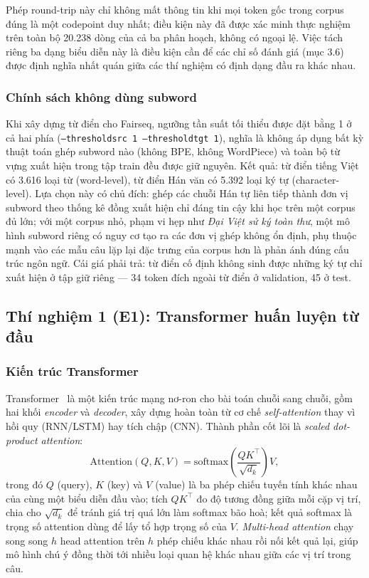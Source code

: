 Phép round-trip này chỉ không mất thông tin khi mọi token gốc trong corpus đúng là một
codepoint duy nhất; điều kiện này đã được xác minh thực nghiệm trên toàn bộ 20.238 dòng
của cả ba phân hoạch, không có ngoại lệ. Việc tách riêng ba dạng biểu diễn này là điều
kiện cần để các chỉ số đánh giá (mục 3.6) được định nghĩa nhất quán giữa các thí nghiệm
có định dạng đầu ra khác nhau.

\subsubsection{Chính sách không dùng subword}

Khi xây dựng từ điển cho Fairseq, ngưỡng tần suất tối thiểu được đặt bằng 1 ở cả hai phía
(\texttt{--thresholdsrc 1 --thresholdtgt 1}), nghĩa là không áp dụng bất kỳ thuật toán
ghép subword nào (không BPE, không WordPiece) và toàn bộ từ vựng xuất hiện trong tập
train đều được giữ nguyên. Kết quả: từ điển tiếng Việt có 3.616 loại từ (word-level), từ
điển Hán văn có 5.392 loại ký tự (character-level). Lựa chọn này có chủ đích: ghép các
chuỗi Hán tự liên tiếp thành đơn vị subword theo thống kê đồng xuất hiện chỉ đáng tin cậy
khi học trên một corpus đủ lớn; với một corpus nhỏ, phạm vi hẹp như \textit{Đại Việt sử
ký toàn thư}, một mô hình subword riêng có nguy cơ tạo ra các đơn vị ghép không ổn định,
phụ thuộc mạnh vào các mẫu câu lặp lại đặc trưng của corpus hơn là phản ánh đúng cấu trúc
ngôn ngữ. Cái giá phải trả: từ điển cố định không sinh được những ký tự chỉ xuất hiện ở
tập giữ riêng — 34 token đích ngoài từ điển ở validation, 45 ở test.

\subsection{Thí nghiệm 1 (E1): Transformer huấn luyện từ đầu}

\subsubsection{Kiến trúc Transformer}

Transformer~\cite{vaswani2017attention} là một kiến trúc mạng nơ-ron cho bài toán chuỗi
sang chuỗi, gồm hai khối \textit{encoder} và \textit{decoder}, xây dựng hoàn toàn từ cơ
chế \textit{self-attention} thay vì hồi quy (RNN/LSTM) hay tích chập (CNN). Thành phần
cốt lõi là \textit{scaled dot-product attention}:
\begin{equation}
  \mathrm{Attention}(Q,K,V) = \mathrm{softmax}\!\left(\frac{QK^{\top}}{\sqrt{d_k}}\right)V,
  \label{eq:e1-attention}
\end{equation}
trong đó $Q$ (query), $K$ (key) và $V$ (value) là ba phép chiếu tuyến tính khác nhau của
cùng một biểu diễn đầu vào; tích $QK^{\top}$ đo độ tương đồng giữa mỗi cặp vị trí, chia
cho $\sqrt{d_k}$ để tránh giá trị quá lớn làm softmax bão hoà; kết quả softmax là trọng số
attention dùng để lấy tổ hợp trọng số của $V$. \textit{Multi-head attention} chạy song
song $h$ head attention trên $h$ phép chiếu khác nhau rồi nối kết quả lại, giúp mô hình
chú ý đồng thời tới nhiều loại quan hệ khác nhau giữa các vị trí trong câu.

